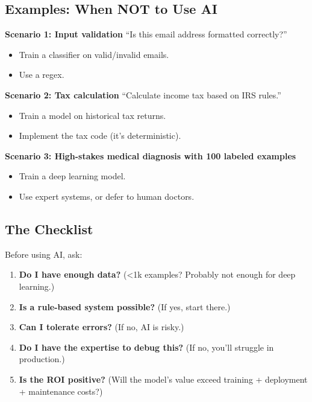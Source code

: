 \subsection{Examples: When NOT to Use AI}

\textbf{Scenario 1: Input validation}
``Is this email address formatted correctly?''

\begin{itemize}
\item[\texttimes] Train a classifier on valid/invalid emails.
\item[\checkmark] Use a regex.
\end{itemize}

\textbf{Scenario 2: Tax calculation}
``Calculate income tax based on IRS rules.''

\begin{itemize}
\item[\texttimes] Train a model on historical tax returns.
\item[\checkmark] Implement the tax code (it's deterministic).
\end{itemize}

\textbf{Scenario 3: High-stakes medical diagnosis with 100 labeled examples}
\begin{itemize}
\item[\texttimes] Train a deep learning model.
\item[\checkmark] Use expert systems, or defer to human doctors.
\end{itemize}

\subsection{The Checklist}

Before using AI, ask:

\begin{enumerate}
\item \textbf{Do I have enough data?} (<1k examples? Probably not enough for deep learning.)
\item \textbf{Is a rule-based system possible?} (If yes, start there.)
\item \textbf{Can I tolerate errors?} (If no, AI is risky.)
\item \textbf{Do I have the expertise to debug this?} (If no, you'll struggle in production.)
\item \textbf{Is the ROI positive?} (Will the model's value exceed training + deployment + maintenance costs?)
\end{enumerate}

